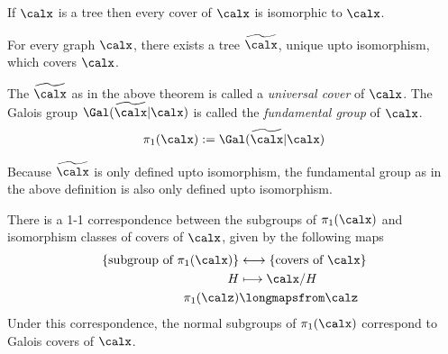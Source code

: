 \begin{proposition}
    If $\calx$ is a tree then every cover of $\calx$ is isomorphic to $\calx$.
  \end{proposition}

  \begin{theorem}
    For every graph $\calx$, there exists a tree $\widetilde{\calx}$, unique upto isomorphism, which covers $\calx$.
  \end{theorem}

  \begin{definition}
    The $\widetilde{\calx}$ as in the above theorem is called a \emph{universal cover} of $\calx$.
    The Galois group $\Gal(\widetilde{\calx}|\calx)$ is called the \emph{fundamental group} of $\calx$.
    \begin{align*}
      \pi_1(\calx) := \Gal(\widetilde{\calx} | \calx)
    \end{align*}
  \end{definition}
  \begin{remark}
    Because $\widetilde{\calx}$ is only defined upto isomorphism, the fundamental group as in the above definition is also only defined upto isomorphism.
  \end{remark}

  \begin{theorem}
    There is a 1-1 correspondence between the subgroups of $\pi_1(\calx)$ and isomorphism classes of covers of $\calx$, given by the following maps
    \begin{align*}
      \{\mbox{subgroup of } \pi_1(\calx)\} &\longleftrightarrow  \{\mbox{covers of $\calx$} \}\\
      H &\longmapsto \calx / H\\
      \pi_1(\calz) & \longmapsfrom \calz
    \end{align*}
    Under this correspondence, the normal subgroups of $\pi_1(\calx)$ correspond to Galois covers of $\calx$.
  \end{theorem}
